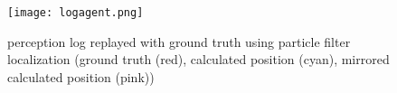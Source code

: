 \begin{figure}[h!]
  \centering
  \texttt{[image: logagent.png]}
  \caption{perception log replayed with ground truth using particle filter localization (ground truth (red), calculated position (cyan), mirrored calculated position (pink))}
  \label{fig:logagent}
\end{figure}





